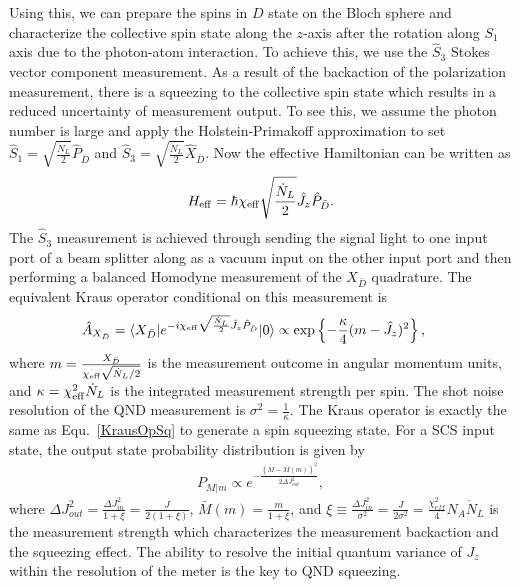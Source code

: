 Using this, we can prepare the spins in $ D $ state on the Bloch sphere and characterize the collective spin state along the $ z $-axis after the rotation along $ S_1 $ axis due to the photon-atom interaction. To achieve this, we use the $ \hat{S}_3 $ Stokes vector component measurement. As a result of the backaction of the polarization measurement, there is a squeezing to the collective spin state which results in a reduced uncertainty of measurement output. To see this, we assume the photon number is large and apply the Holstein-Primakoff approximation to set $ \hat{S}_1=\sqrt{\frac{\dot{N}_L}{2}}\hat{P}_{\bar{D}} $ and $ \hat{S}_3=\sqrt{\frac{\dot{N}_L}{2}}\hat{X}_{\bar{D}} $. Now the effective Hamiltonian can be written as
\begin{align}
H_{\rm eff} = \hbar \chi_{\rm eff} \sqrt{\frac{\dot{N}_L}{2}}\hat{J}_z \hat{P}_{\bar{D}}. 
\end{align}
The $ \hat{S}_3 $ measurement is achieved through sending the signal light to one input port of a beam splitter along as a vacuum input on the other input port and then performing a balanced Homodyne measurement of the $ X_{\bar{D}} $ quadrature. The equivalent Kraus operator conditional on this measurement is 
\begin{align}
\hat{A}_{X_{\bar{D}}} &= \langle{X_{\bar{D}}}\rvert e^{-i\chi_{\rm eff} \sqrt{\frac{\dot{N}_L}{2}}\hat{J}_z \hat{P}_{\bar{D}}} \lvert{0}\rangle\propto \exp\left\{ -\frac{\kappa }{4}(m-\hat{J}_z)^2 \right\},
\end{align} 
where $ m=\frac{X_{\bar{D}}}{\chi_{\rm eff} \sqrt{\dot{N}_L/2}} $ is the measurement outcome in angular momentum units, and $ \kappa =\chi_{\rm eff}^2\dot{N}_L $ is the integrated measurement strength per spin. The shot noise resolution of the QND measurement is $ \sigma^2=\frac{1}{\kappa } $. The Kraus operator is exactly the same as Equ.~\eqref{KrausOpSq} to generate a spin squeezing
 state. For a SCS input state, the output state probability distribution is given by 
\begin{align}
P_{M|m} \propto e^{-\frac{(M-\bar{M}(m))^2}{2\Delta J_{out}^2}},
\end{align}
where $ \Delta J_{out}^2 =\frac{\Delta J_{in}^2}{1+\xi}=\frac{J}{2(1+\xi)} $, $ \bar{M}(m)=\frac{m}{1+\xi} $, and $ \xi\equiv \frac{\Delta J_{in}^2}{\sigma^2}=\frac{J}{2\sigma^2}=\frac{\chi_{e\!f\!f}^2}{4}N_A\dot{N}_L $ is the measurement strength which characterizes the measurement backaction and the squeezing effect. The ability to resolve the initial quantum variance of $ J_z $ within the resolution of the meter is the key to QND squeezing. 


